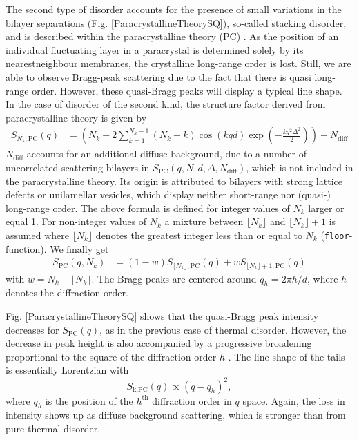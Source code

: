 The second type of disorder accounts for the presence of small
variations in the bilayer separations (Fig.
\ref{ParacrystallineTheorySQ}), so-called stacking disorder, and is
described within the paracrystalline theory (PC)
\cite{Hosemann1962,Guinier1963,Blaurock1982,Pabst2003,Fruhwirth2004}. As the position of an
individual fluctuating layer in a paracrystal is determined solely
by its nearestneighbour membranes, the crystalline long-range order
is lost. Still, we are able to observe Bragg-peak scattering due to
the fact that there is quasi long-range order. However, these
quasi-Bragg peaks will display a typical line shape. In the case of
disorder of the second kind, the structure factor derived from
paracrystalline theory is given by \cite{Guinier1963}
\begin{align} \label{eq:PCMonoSum}
S_{N_k,\mathrm{PC}}(q) &= \left( N_k + 2 \sum_{k=1}^{N_k-1} (N_k-k)
\cos(kqd) \exp\left( -\frac{kq^2\Delta^2}{2}\right) \right) +N_\mathrm{diff}%
\end{align}
$N_\text{diff}$ accounts for an additional
diffuse background, due to a number of uncorrelated
scattering bilayers in $S_\text{PC}(q,N,d,\Delta,N_\text{diff})$,
which is not included in the paracrystalline theory.
Its origin is attributed to bilayers with strong lattice defects or
unilamellar vesicles, which display neither short-range nor
(quasi-) long-range order.
The above formula is defined for integer values of $N_k$ larger or equal 1. For non-integer values of $N_k$ a mixture between $\lfloor N_k\rfloor$ and $\lfloor N_k\rfloor+1$ is assumed where $\lfloor N_k \rfloor$ denotes the greatest integer less than or equal to $N_k$ (\texttt{\texttt{floor}}-function). We finally get
\begin{align} \label{eq:continuesSQPC}
S_\mathrm{PC}(q,N_k) &= (1-w)S_{\lfloor N_k\rfloor,\mathrm{PC}}(q) + w S_{\lfloor N_k\rfloor+1,\mathrm{PC}}(q)
\end{align}
with $w=N_k-\lfloor N_k\rfloor$.
The Bragg peaks are centered around $q_h=2\pi h/d$, where $h$ denotes
the diffraction order.

Fig. \ref{ParacrystallineTheorySQ} shows that the quasi-Bragg peak
intensity decreases for $S_\text{PC}(q)$, as in the previous case of
thermal disorder. However, the decrease in peak height is also
accompanied by a progressive broadening proportional to the square
of the diffraction order $h$ \cite{Schwartz1975}. The line shape of
the tails is essentially Lorentzian with
$$S_\text{k,PC}(q) \propto (q - q_h)^2,$$
where $q_h$ is the position of the $h^\text{th}$ diffraction order
in $q$ space. Again, the loss in intensity shows up as diffuse
background scattering, which is stronger than from pure thermal
disorder.


